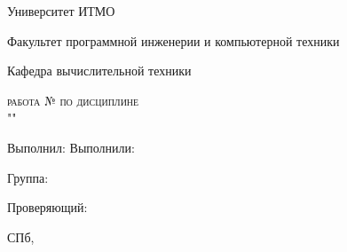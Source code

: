 \begin{titlepage}
	\begin{center}
		\large
		Университет ИТМО

		\vspace{0.25cm}
		
		Факультет программной инженерии и компьютерной техники
		
		Кафедра вычислительной техники
		\vfill
		
		\textsc{\labtype\space работа \ifisnum № \labnum{} \fi по дисциплине \\"\labsubj" \ifisname\small \\ \labname \fi}
			
		\bigskip
	\end{center}
	\vfill
	\vfill
	
	\begin{flushright}
	\ifisone
	Выполнил: \labauthor
	\else
	Выполнили: \labauthor
	\fi

	\vspace{0.25cm}
	Группа: \labgroup
			
	\vspace{0.25cm}
	\ifisinsp
	Проверяющий: \labinsp
	\fi
	\end{flushright}
	\vfill
	
	\begin{center}
	СПб, \the\year
	\end{center}
\end{titlepage}
